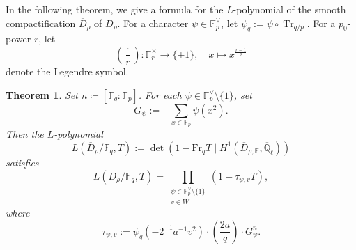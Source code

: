 \documentclass[12pt,a4paper]{amsart}
\newtheorem{theorem}{Theorem}[section]
\theoremstyle{definition}
\def\F{{\mathbb F}}
\def\Ql{\overline{\mathbb{Q}}_\ell}
\theoremstyle{remark}
\DeclareMathOperator{\Tr}{Tr}
\begin{document}
In the following theorem, we give a formula for the 
$L$-polynomial of the smooth compactification $\overline{D}_{\rho}$ of $D_\rho$. 
For a character $\psi \in \F_p^{\vee}$, let 
 $\psi_q:=\psi \circ \Tr_{q/p}$. 
 For a $p_0$-power $r$, let 
 \[
 \left(\frac{\cdot}{r}\right)
 \colon \F_r^{\times} \to \{\pm 1\},\quad x \mapsto x^{\frac{r-1}{2}}
 \]
 denote the Legendre symbol. 
\begin{theorem}\label{lp}
Set $n\coloneqq[\F_q:\F_p]$. 
For each $\psi\in \F_p^\vee\setminus\{1\}$, set 
\[
G_{\psi}:=-\sum_{x \in \F_p} \psi(x^2). 
\]
Then the $L$-polynomial  
\[
L(\overline{D}_{\rho}/\F_q, T):=\det(1-\mathrm{Fr}_q  T \mid 
H^1(\overline{D}_{\rho,\F},\Ql)) 
\]
satisfies  
\[
L(\overline{D}_{\rho}/\F_q, T)=\prod_{\substack{\psi\in\F_p^\vee\setminus\{1\} \\ v\in W}} (1-\tau_{\psi,v} T), 
\]
where 
\[
\tau_{\psi,v}:=\psi_q(-2^{-1} a^{-1} v^2) \cdot \left(\frac{2a}{q}\right) \cdot 
G_{\psi}^n. 
\]
\end{theorem}
\end{document}
